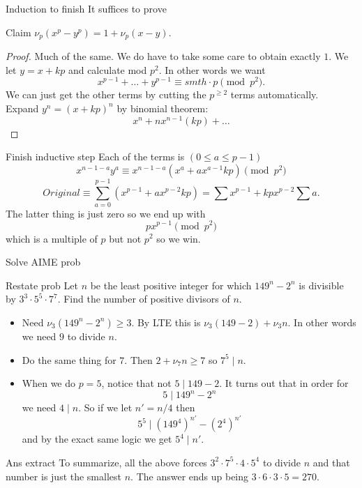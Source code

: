 \documentclass{tropical}
\begin{document}
\begin{frame}{Induction to finish}
It suffices to prove
\begin{block}{Claim}
$\nu_p(x^p-y^p)=1+\nu_p(x-y).$
\end{block}
\begin{proof}
Much of the same. We do have to take some care to obtain exactly $1$.
We let $y=x+kp$ and calculate mod $p^2$. In other words we want
\[x^{p-1}+\dots+ y^{p-1} \equiv smth\cdot p \pmod{p^2}.\]
We can just get the other terms by cutting the $p^{\ge2}$ terms 
automatically.\\
Expand $y^n=(x+kp)^n$ by binomial theorem:
\[x^n+nx^{n-1}(kp)+\dots\]
\end{proof}
\end{frame}
\begin{frame}{Finish inductive step}
Each of the terms is $(0\le a \le p-1)$ 
\[x^{n-1-a}y^a\equiv x^{n-1-a}(x^a+ax^{a-1}kp)\pmod{p^2}\]
\[Original \equiv \sum_{a=0}^{p-1}(x^{p-1}+ax^{p-2}kp)=\sum x^{p-1}
+kpx^{p-2}\sum a.\]
The latter thing is just zero so we end up with 
\[px^{p-1}\pmod{p^2}\]
which is a multiple of $p$ but not $p^2$ so we win.
\end{frame}
\begin{frame}{Solve AIME prob}
\begin{block}{Restate prob}
Let $n$ be the least positive integer for which 
$149^n - 2^n$ is divisible by $3^3 \cdot 5^5 \cdot 7^7$. 
Find the number of positive divisors of $n$.
\end{block}

\begin{itemize}
\item Need $\nu_3(149^n-2^n)\ge 3$. By LTE this is $\nu_3(149-2)+\nu_3 n$.
In other words we need $9$ to divide $n$.
\item Do the same thing for $7$. Then $2+\nu_7 n \ge 7$ so $7^5\mid n$.
\item When we do $p=5$, notice that not $5\mid 149-2$. It turns out that 
in order for 
\[5\mid 149^n-2^n\]
we need $4\mid n$. So if we let $n'=n/4$ then
\[5^5 \mid (149^4)^{n'}-(2^4)^{n'}\]
and by the exact same logic we get $5^4\mid n'$.
\end{itemize}
\end{frame}
\begin{frame}{Ans extract}
To summarize, all the above forces $3^2\cdot 7^5 \cdot 4\cdot 5^4$
to divide $n$ and that number is just the smallest $n$.
The answer ends up being $3\cdot 6 \cdot 3\cdot 5=\boxed{270}$.
\end{frame}
\end{document}
